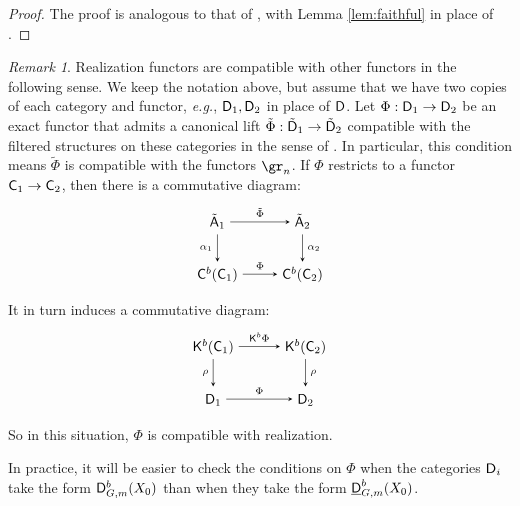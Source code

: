 \documentclass[a4paper,10pt,leqno]{amsart}
\theoremstyle{plain}
\theoremstyle{plain}
\theoremstyle{plain}
\theoremstyle{definition}
\theoremstyle{remark}
\newtheorem{rem}[thm]{Remark}
\begin{document}
\begin{proof}
The proof is analogous to that of \cite[Prop.\ 3.7]{rider}, with Lemma \ref{lem:faithful} in place of \cite[Lem.\ 3.5]{rider}.
\end{proof}

\begin{rem}\label{rem:compatible}
Realization functors are compatible with other functors in the following sense.
We keep the notation above, but assume that we have two copies of each category and functor, \emph{e.g.}, $\sf{D}_1, \sf{D}_2$ in place of $\sf{D}$.
Let $\Phi : \sf{D}_1 \to \sf{D}_2$ be an exact functor that admits a canonical lift $\tilde{\Phi} : \tilde{\sf{D}}_1 \to \tilde{\sf{D}}_2$ compatible with the filtered structures on these categories in the sense of \cite{beilinson}.
In particular, this condition means $\tilde{\Phi}$ is compatible with the functors $\gr_n$.
If $\Phi$ restricts to a functor $\sf{C}_1 \to \sf{C}_2$, then there is a commutative diagram:
\begin{equation}
\begin{tikzpicture}[baseline=(current bounding box.center), >=stealth]
\matrix(m)[matrix of math nodes, row sep=2em, column sep=2.5em, text height=2ex, text depth=0.5ex]
{	\tilde{\sf{A}}_1
		&\tilde{\sf{A}}_2\\
	\sf{C}^b(\sf{C}_1)
		&\sf{C}^b(\sf{C}_2)\\
		};
\path[->,font=\scriptsize, auto]
(m-1-1)		edge node{$\tilde{\Phi}$} (m-1-2)
(m-2-1)		edge node{$\Phi$} (m-2-2)
(m-1-1)		edge node[left]{$\alpha_1$} (m-2-1)
(m-1-2)		edge node{$\alpha_2$} (m-2-2);
\end{tikzpicture}
\end{equation}
It in turn induces a commutative diagram:
\begin{equation}
\begin{tikzpicture}[baseline=(current bounding box.center), >=stealth]
\matrix(m)[matrix of math nodes, row sep=2em, column sep=3em, text height=2ex, text depth=0.5ex]
{	\sf{K}^b(\sf{C}_1)
		&\sf{K}^b(\sf{C}_2)\\
	\sf{D}_1
		&\sf{D}_2\\
		};
\path[->,font=\scriptsize, auto]
(m-1-1)		edge node{$\sf{K}^b\Phi$} (m-1-2)
(m-2-1)		edge node{$\Phi$} (m-2-2)
(m-1-1)		edge node[left]{$\rho$} (m-2-1)
(m-1-2)		edge node{$\rho$} (m-2-2);
\end{tikzpicture}
\end{equation}
So in this situation, $\Phi$ is compatible with realization.

In practice, it will be easier to check the conditions on $\Phi$ when the categories $\sf{D}_i$ take the form $\sf{D}_{G, m}^b(X_0)$ than when they take the form $\underline{\sf{D}}_{G, m}^b(X_0)$.
\end{rem}
\end{document}
